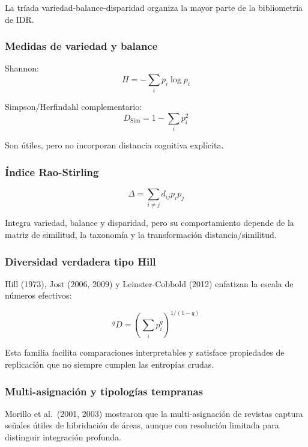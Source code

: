 \documentclass[
]{article}
\begin{document}
La tríada variedad-balance-disparidad organiza la mayor parte de la
bibliometría de IDR.

\hypertarget{medidas-de-variedad-y-balance}{%
\subsubsection{Medidas de variedad y
balance}\label{medidas-de-variedad-y-balance}}

Shannon: \[H = -\sum_i p_i \log p_i\]

Simpson/Herfindahl complementario: \[D_{\mathrm{Sim}} = 1-\sum_i p_i^2\]

Son útiles, pero no incorporan distancia cognitiva explícita.

\hypertarget{uxedndice-rao-stirling}{%
\subsubsection{Índice Rao-Stirling}\label{uxedndice-rao-stirling}}

\[\Delta = \sum_{i \neq j} d_{ij} p_i p_j\]

Integra variedad, balance y disparidad, pero su comportamiento depende
de la matriz de similitud, la taxonomía y la transformación
distancia/similitud.

\hypertarget{diversidad-verdadera-tipo-hill}{%
\subsubsection{Diversidad verdadera tipo
Hill}\label{diversidad-verdadera-tipo-hill}}

Hill (1973), Jost (2006, 2009) y Leinster-Cobbold (2012) enfatizan la
escala de números efectivos:

\[^qD = \left(\sum_i p_i^q\right)^{1/(1-q)}\]

Esta familia facilita comparaciones interpretables y satisface
propiedades de replicación que no siempre cumplen las entropías crudas.

\hypertarget{multi-asignaciuxf3n-y-tipologuxedas-tempranas}{%
\subsubsection{Multi-asignación y tipologías
tempranas}\label{multi-asignaciuxf3n-y-tipologuxedas-tempranas}}

Morillo et al.~(2001, 2003) mostraron que la multi-asignación de
revistas captura señales útiles de hibridación de áreas, aunque con
resolución limitada para distinguir integración profunda.
\end{document}

